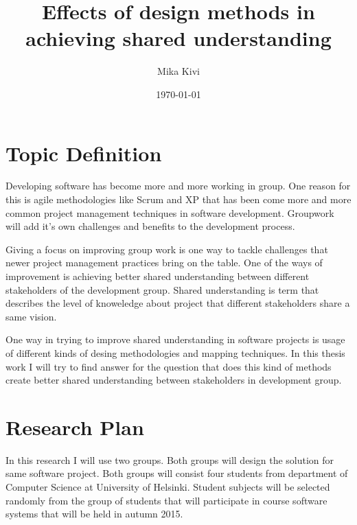 \documentclass[english]{tktltiki2}
\title{Effects of design methods in achieving shared understanding}
\author{Mika Kivi}
\date{\today}
\theoremstyle{definition}
\theoremstyle{remark}
\begin{document}

\frontmatter      %

\maketitle        %
\makeabstract     %

\tableofcontents  %


\mainmatter       %

\section{Topic Definition}

Developing software has become more and more working in group. One reason for this is agile methodologies like Scrum and XP that has been come more and more common project management techniques in software development. Groupwork will add it's own challenges and benefits to the development process.

Giving a focus on improving group work is one way to tackle challenges that newer project management practices bring on the table. One of the ways of improvement is achieving better shared understanding between different stakeholders of the development group. Shared understanding is term that describes the level of knoweledge about project that different stakeholders share a same vision.

One way in trying to improve shared understanding in software projects is usage of different kinds of desing methodologies and mapping techniques. In this thesis work I will try to find answer for the question that does this kind of methods create better shared understanding between stakeholders in development group.

\section{Research Plan}


In this research I will use two groups. Both groups will design the solution for same software project. Both groups will consist four students from department of Computer Science at University of Helsinki. Student subjects will be selected randomly from the group of students that will participate in course software systems that will be held in autumn 2015.
\end{document}
